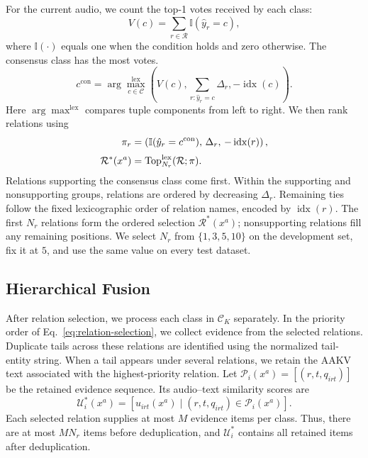 For the current audio, we count the top-1 votes received by each class:
\begin{equation}
V(c)=\sum_{r\in\mathcal R}\mathbb I(\hat y_r=c),
\label{eq:voting}
\end{equation}
where $\mathbb I(\cdot)$ equals one when the condition holds and zero otherwise. The consensus class has the most votes. 
\begin{equation}
c^{\mathrm{con}}=\arg\max_{c\in\mathcal C}^{\mathrm{lex}}\left(V(c),\sum_{r:\hat y_r=c}\Delta_r,-\operatorname{idx}(c)\right).
\label{eq:consensus}
\end{equation}
Here $\arg\max^{\mathrm{lex}}$ compares tuple components from left to right. We then rank relations using
\begin{equation}
\begin{aligned}
\pi_r &= \left(\mathbb I(\hat y_r=c^{\mathrm{con}}),\,\Delta_r,\,-\operatorname{idx}(r)\right),\\[2pt]
\mathcal R^*(x^a) &= \operatorname{Top}_{N_r}^{\mathrm{lex}}(\mathcal R;\pi).
\end{aligned}
\label{eq:relation-selection}
\end{equation}
Relations supporting the consensus class come first. Within the supporting and nonsupporting groups, relations are ordered by decreasing $\Delta_r$. Remaining ties follow the fixed lexicographic order of relation names, encoded by $\operatorname{idx}(r)$. The first $N_r$ relations form the ordered selection $\mathcal R^*(x^a)$; nonsupporting relations fill any remaining positions.  We select $N_r$ from $\{1,3,5,10\}$ on the development set, fix it at $5$, and use the same value on every test dataset.

\subsection{Hierarchical Fusion}\label{sec:fusion-method}

After relation selection, we process each class in $\mathcal C_K$ separately. In the priority order of Eq.~\eqref{eq:relation-selection}, we collect evidence from the selected relations. Duplicate tails across these relations are identified using the normalized tail-entity string. When a tail appears under several relations, we retain the AAKV text associated with the highest-priority relation. Let $\mathcal P_i(x^a)=[(r,t,q_{irt})]$ be the retained evidence sequence. Its audio--text similarity scores are
\begin{equation}
\mathcal U_i^*(x^a)=\left[u_{irt}(x^a)\mid(r,t,q_{irt})\in\mathcal P_i(x^a)\right].
\label{eq:selected-evidence}
\end{equation}
Each selected relation supplies at most $M$ evidence items per class. Thus, there are at most $MN_r$ items before deduplication, and $\mathcal U_i^*$ contains all retained items after deduplication.

